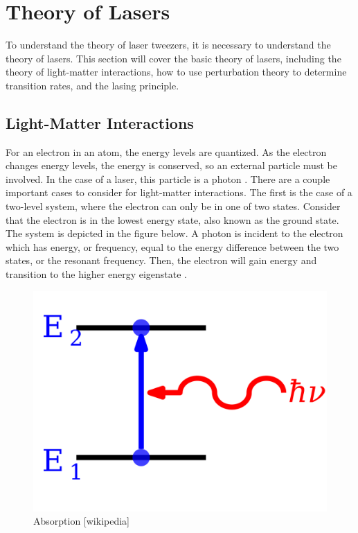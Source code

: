 \documentclass{article}
\begin{document}
\section*{Theory of Lasers}

To understand the theory of laser tweezers, it is necessary to understand the theory of lasers. This section will cover the basic theory of lasers, including the theory of light-matter interactions, how to use perturbation theory to determine transition rates, and the lasing principle.

\subsection*{Light-Matter Interactions}

For an electron in an atom, the energy levels are quantized. As the electron changes energy levels, the energy is conserved, so an external particle must be involved. In the case of a laser, this particle is a photon \cite{Griffiths}. There are a couple important cases to consider for light-matter interactions. The first is the case of a two-level system, where the electron can only be in one of two states. Consider that the electron is in the lowest energy state, also known as the ground state. The system is depicted in the figure below. A photon is incident to the electron which has energy, or frequency, equal to the energy difference between the two states, or the resonant frequency. Then, the electron will gain energy and transition to the higher energy eigenstate \cite{Griffiths}.


\begin{figure}[h!]
    \begin{center}
    \includegraphics[width=0.5\linewidth]{Pictures/absorption.png}
    \caption{Absorption [wikipedia]}
    \label{fig:Absorption}
    \end{center}
\end{figure}
\end{document}
